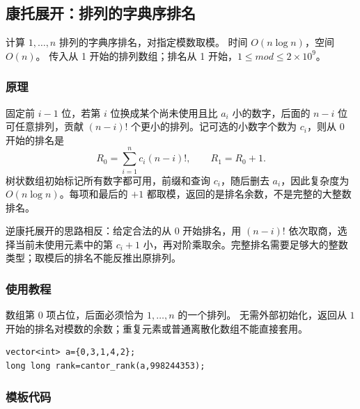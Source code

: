 \subsection{康托展开：排列的字典序排名}
\label{algo:cantor}
\AlgorithmInfo
    {计算 $1,\ldots,n$ 排列的字典序排名，对指定模数取模。}
    {时间 $O(n\log n)$，空间 $O(n)$。}
    {传入从 1 开始的排列数组；排名从 1 开始，$1\leq mod\leq2\times10^9$。}

\subsubsection*{原理}
固定前 $i-1$ 位，若第 $i$ 位换成某个尚未使用且比 $a_i$ 小的数字，后面的 $n-i$ 位可任意排列，贡献 $(n-i)!$ 个更小的排列。记可选的小数字个数为 $c_i$，则从 $0$ 开始的排名是
\[
    R_0=\sum_{i=1}^n c_i(n-i)!,\qquad R_1=R_0+1.
\]
树状数组初始标记所有数字都可用，前缀和查询 $c_i$，随后删去 $a_i$，因此复杂度为 $O(n\log n)$。每项和最后的 $+1$ 都取模，返回的是排名余数，不是完整的大整数排名。

逆康托展开的思路相反：给定合法的从 $0$ 开始排名，用 $(n-i)!$ 依次取商，选择当前未使用元素中的第 $c_i+1$ 小，再对阶乘取余。完整排名需要足够大的整数类型；取模后的排名不能反推出原排列。

\subsubsection*{使用教程}
数组第 $0$ 项占位，后面必须恰为 $1,\ldots,n$ 的一个排列。 无需外部初始化，返回从 $1$ 开始的排名对模数的余数；重复元素或普通离散化数组不能直接套用。
\begin{lstlisting}[style=mtycpp,numbers=none]
vector<int> a={0,3,1,4,2};
long long rank=cantor_rank(a,998244353);
\end{lstlisting}

\subsubsection*{模板代码}
